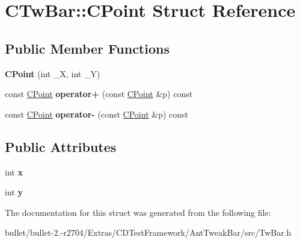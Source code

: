 \hypertarget{struct_c_tw_bar_1_1_c_point}{\section{C\+Tw\+Bar\+:\+:C\+Point Struct Reference}
\label{struct_c_tw_bar_1_1_c_point}
}
\subsection*{Public Member Functions}
\begin{DoxyCompactItemize}
\item 
\hypertarget{struct_c_tw_bar_1_1_c_point_a9732306c9f0d20ac11f0520d14d6016c}{{\bfseries C\+Point} (int \+\_\+\+X, int \+\_\+\+Y)}\label{struct_c_tw_bar_1_1_c_point_a9732306c9f0d20ac11f0520d14d6016c}

\item 
\hypertarget{struct_c_tw_bar_1_1_c_point_a32da7ea90b8732480bb619fc12f00608}{const \hyperlink{struct_c_tw_bar_1_1_c_point}{C\+Point} {\bfseries operator+} (const \hyperlink{struct_c_tw_bar_1_1_c_point}{C\+Point} \&p) const }\label{struct_c_tw_bar_1_1_c_point_a32da7ea90b8732480bb619fc12f00608}

\item 
\hypertarget{struct_c_tw_bar_1_1_c_point_a44d0b637160b9c224e8c31364dfc6eb6}{const \hyperlink{struct_c_tw_bar_1_1_c_point}{C\+Point} {\bfseries operator-\/} (const \hyperlink{struct_c_tw_bar_1_1_c_point}{C\+Point} \&p) const }\label{struct_c_tw_bar_1_1_c_point_a44d0b637160b9c224e8c31364dfc6eb6}

\end{DoxyCompactItemize}
\subsection*{Public Attributes}
\begin{DoxyCompactItemize}
\item 
\hypertarget{struct_c_tw_bar_1_1_c_point_a8a98bc2e74e015085ce95c2e057436f9}{int {\bfseries x}}\label{struct_c_tw_bar_1_1_c_point_a8a98bc2e74e015085ce95c2e057436f9}

\item 
\hypertarget{struct_c_tw_bar_1_1_c_point_a7733c132785718bc84bea40244265eb7}{int {\bfseries y}}\label{struct_c_tw_bar_1_1_c_point_a7733c132785718bc84bea40244265eb7}

\end{DoxyCompactItemize}


The documentation for this struct was generated from the following file\+:\begin{DoxyCompactItemize}
\item 
bullet/bullet-\/2.-\/r2704/\+Extras/\+C\+D\+Test\+Framework/\+Ant\+Tweak\+Bar/src/Tw\+Bar.\+h\end{DoxyCompactItemize}
